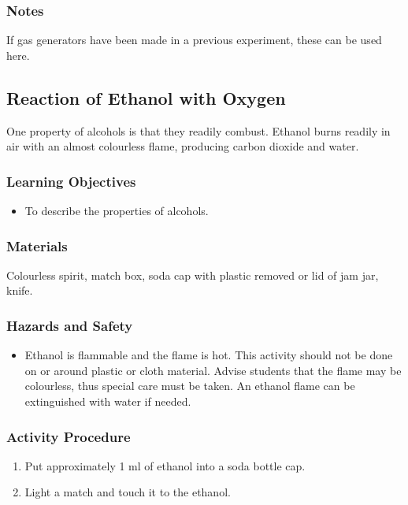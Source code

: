 \subsubsection*{Notes}
If gas generators have been made in a previous experiment, these can be used here.

\subsection{Reaction of Ethanol with Oxygen}

One property of alcohols is that they readily combust. Ethanol burns readily in air with an almost colourless flame, producing carbon dioxide and water.

\subsubsection*{Learning Objectives}
\begin{itemize}
\item{To describe the properties of alcohols.}
\end{itemize}

\subsubsection*{Materials}
Colourless spirit, match box, soda cap with plastic removed or lid of jam jar, knife.

\subsubsection*{Hazards and Safety}
\begin{itemize}
\item{Ethanol is flammable and the flame is hot. This activity should not be done on or around plastic or cloth material. Advise students that the flame may be colourless, thus special care must be taken. An ethanol flame can be extinguished with water if needed.}
\end{itemize}

\subsubsection*{Activity Procedure}
\begin{enumerate}
\item{Put approximately 1 ml of ethanol into a soda bottle cap.}
\item{Light a match and touch it to the ethanol.}
\end{enumerate}

